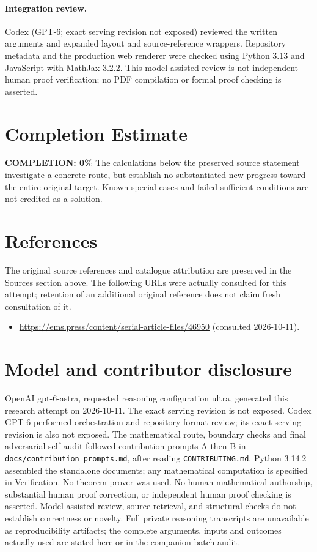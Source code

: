 \documentclass[11pt]{article}
\begin{document}
\paragraph{Integration review.} Codex (GPT-6; exact serving revision not exposed) reviewed the written arguments and expanded layout and source-reference wrappers. Repository metadata and the production web renderer were checked using Python 3.13 and JavaScript with MathJax 3.2.2. This model-assisted review is not independent human proof verification; no PDF compilation or formal proof checking is asserted.

\section{Completion Estimate}
\noindent\textbf{COMPLETION: 0\%}
The calculations below the preserved source statement investigate a concrete route,
but establish no substantiated new progress toward the entire original target.
Known special cases and failed sufficient conditions are not credited as a solution.
\section{References}
The original source references and catalogue attribution are preserved in the
Sources section above. The following URLs were actually consulted for this attempt;
retention of an additional original reference does not claim fresh consultation of it.
\begin{itemize}
\item \url{https://ems.press/content/serial-article-files/46950} (consulted 2026-10-11). 
\end{itemize}
\section{Model and contributor disclosure}
OpenAI gpt-6-astra, requested reasoning configuration ultra, generated this research
attempt on 2026-10-11. The exact serving revision is not exposed. Codex GPT-6
performed orchestration and repository-format review; its exact serving revision
is also not exposed. The mathematical route, boundary checks and final adversarial
self-audit followed contribution prompts A then B in
\texttt{docs/contribution\_prompts.md}, after reading \texttt{CONTRIBUTING.md}.
Python 3.14.2 assembled the standalone documents; any mathematical computation is
specified in Verification. No theorem prover was used. No human mathematical
authorship, substantial human proof correction, or independent human proof checking
is asserted. Model-assisted review, source retrieval, and structural checks do not
establish correctness or novelty. Full private reasoning transcripts are unavailable
as reproducibility artifacts; the complete arguments, inputs and outcomes actually
used are stated here or in the companion batch audit.
\end{document}

